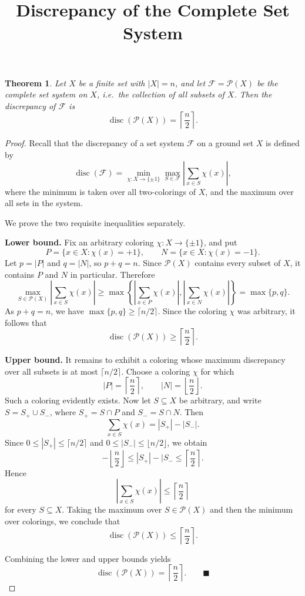 \documentclass[11pt]{article}
\title{Discrepancy of the Complete Set System}
\author{}
\date{}
\newtheorem{theorem}{Theorem}
\DeclareMathOperator{\disc}{disc}
\begin{document}
\maketitle

\begin{theorem}
Let \(X\) be a finite set with \(|X| = n\), and let
\(\mathcal{F} = \mathcal{P}(X)\) be the complete set system on \(X\),
i.e.\ the collection of all subsets of \(X\). Then the discrepancy of
\(\mathcal{F}\) is
\[
\disc(\mathcal{P}(X)) = \left\lceil \frac{n}{2} \right\rceil.
\]
\end{theorem}

\begin{proof}
Recall that the discrepancy of a set system \(\mathcal{F}\) on a
ground set \(X\) is defined by
\[
\disc(\mathcal{F})
= \min_{\chi \colon X \to \{\pm 1\}}
  \max_{S \in \mathcal{F}}
  \left| \sum_{x \in S} \chi(x) \right|,
\]
where the minimum is taken over all two-colorings of \(X\), and the
maximum over all sets in the system.

We prove the two requisite inequalities separately.

\medskip
\noindent\textbf{Lower bound.}
Fix an arbitrary coloring \(\chi \colon X \to \{\pm 1\}\), and put
\[
P = \{x \in X : \chi(x) = +1\},
\qquad
N = \{x \in X : \chi(x) = -1\}.
\]
Let \(p = |P|\) and \(q = |N|\), so \(p + q = n\). Since
\(\mathcal{P}(X)\) contains every subset of \(X\), it contains \(P\)
and \(N\) in particular. Therefore
\[
\max_{S \in \mathcal{P}(X)}
\left| \sum_{x \in S} \chi(x) \right|
\ge
\max\left\{
  \left| \sum_{x \in P} \chi(x) \right|,
  \left| \sum_{x \in N} \chi(x) \right|
\right\}
= \max\{p, q\}.
\]
As \(p + q = n\), we have \(\max\{p, q\} \ge \lceil n/2 \rceil\).
Since the coloring \(\chi\) was arbitrary, it follows that
\[
\disc(\mathcal{P}(X)) \ge \left\lceil \frac{n}{2} \right\rceil.
\]

\medskip
\noindent\textbf{Upper bound.}
It remains to exhibit a coloring whose maximum discrepancy over all
subsets is at most \(\lceil n/2 \rceil\). Choose a coloring \(\chi\)
for which
\[
|P| = \left\lceil \frac{n}{2} \right\rceil,
\qquad
|N| = \left\lfloor \frac{n}{2} \right\rfloor.
\]
Such a coloring evidently exists. Now let \(S \subseteq X\) be
arbitrary, and write \(S = S_+ \cup S_-\), where
\(S_+ = S \cap P\) and \(S_- = S \cap N\). Then
\[
\sum_{x \in S} \chi(x) = |S_+| - |S_-|.
\]
Since \(0 \le |S_+| \le \lceil n/2 \rceil\) and
\(0 \le |S_-| \le \lfloor n/2 \rfloor\), we obtain
\[
-\left\lfloor \frac{n}{2} \right\rfloor
\le |S_+| - |S_-
\le \left\lceil \frac{n}{2} \right\rceil.
\]
Hence
\[
\left| \sum_{x \in S} \chi(x) \right|
\le \left\lceil \frac{n}{2} \right\rceil
\]
for every \(S \subseteq X\). Taking the maximum over
\(S \in \mathcal{P}(X)\) and then the minimum over colorings, we
conclude that
\[
\disc(\mathcal{P}(X)) \le \left\lceil \frac{n}{2} \right\rceil.
\]

Combining the lower and upper bounds yields
\[
\disc(\mathcal{P}(X)) = \left\lceil \frac{n}{2} \right\rceil.
\qquad \blacksquare
\]
\end{proof}
\end{document}
